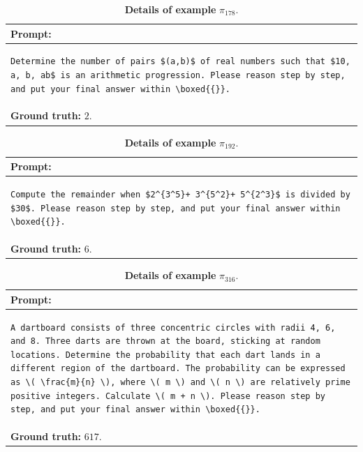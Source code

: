 \begin{table}[htbp]
\centering
\caption{\textbf{Details of example} $\pi_{178}$.}
\begin{tabular}{p{}}
\toprule
\textbf{Prompt:} \\
\midrule
\footnotesize
\begin{lstlisting}[breaklines=true, basicstyle=\ttfamily, aboveskip=-1.0em, belowskip=0pt, breakindent=0pt]
Determine the number of pairs $(a,b)$ of real numbers such that $10, a, b, ab$ is an arithmetic progression. Please reason step by step, and put your final answer within \boxed{{}}.
\end{lstlisting} \\
\midrule
\textbf{Ground truth:} $2$. \\
\bottomrule
\end{tabular}
\end{table}


\begin{table}[htbp]
\centering
\caption{\textbf{Details of example} $\pi_{192}$.}
\begin{tabular}{p{}}
\toprule
\textbf{Prompt:} \\
\midrule
\footnotesize
\begin{lstlisting}[breaklines=true, basicstyle=\ttfamily, aboveskip=-1.0em, belowskip=0pt, breakindent=0pt]
Compute the remainder when $2^{3^5}+ 3^{5^2}+ 5^{2^3}$ is divided by $30$. Please reason step by step, and put your final answer within \boxed{{}}.
\end{lstlisting} \\
\midrule
\textbf{Ground truth:} $6$. \\
\bottomrule
\end{tabular}
\end{table}


\begin{table}[htbp]
\centering
\caption{\textbf{Details of example} $\pi_{316}$.}
\begin{tabular}{p{}}
\toprule
\textbf{Prompt:} \\
\midrule
\footnotesize
\begin{lstlisting}[breaklines=true, basicstyle=\ttfamily, aboveskip=-1.0em, belowskip=0pt, breakindent=0pt]
A dartboard consists of three concentric circles with radii 4, 6, and 8. Three darts are thrown at the board, sticking at random locations. Determine the probability that each dart lands in a different region of the dartboard. The probability can be expressed as \( \frac{m}{n} \), where \( m \) and \( n \) are relatively prime positive integers. Calculate \( m + n \). Please reason step by step, and put your final answer within \boxed{{}}.
\end{lstlisting} \\
\midrule
\textbf{Ground truth:} $617$. \\
\bottomrule
\end{tabular}
\end{table}



